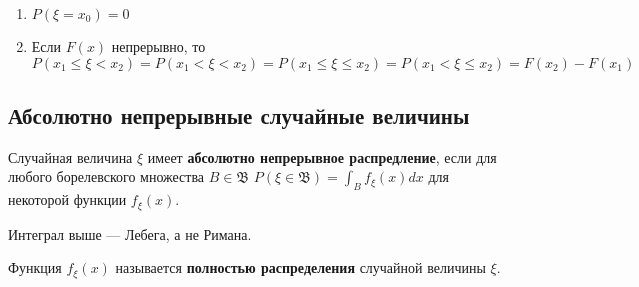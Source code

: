 \begin{prop}
\begin{enumerate}
\begin{proof}
                  \begin{align*}
                      P(C_n) + P(\xi \geq x_0)                       & = P(\xi = x_0)                           \\
                      P\left(x_0 \leq \xi < x_0 + \frac{1}{n}\right) & \xrightarrow{n \to +\infty} P(\xi = x_0) \\
                      F\left(x_0 + \frac{1}{n}\right) - F(x_0)       & \xrightarrow{n \to +\infty} P(\xi = x_0) \\
                      F(x_0 + 0) - F(x_0) = P(\xi = x_0)
                  \end{align*}
              \end{proof}

        \item \(P(\xi = x_0) = 0\)
        \item Если \(F(x)\) непрерывно, то \(P(x_1 \leq \xi < x_2) = P(x_1 < \xi < x_2) = P(x_1 \leq \xi \leq x_2) = P(x_1 < \xi \leq x_2) = F(x_2) - F(x_1)\)
    \end{enumerate}
\end{prop}

\subsection{Абсолютно непрерывные случайные величины}

\begin{definition}
    Случайная величина \(\xi\) имеет \textbf{абсолютно непрерывное распредление}, если для любого борелевского множества \(B \in \mathfrak{B}\) \(P(\xi \in \mathfrak{B}) = \int_B f_\xi(x) dx\) для некоторой функции \(f_\xi(x)\).
\end{definition}

\begin{remark}
    Интеграл выше --- Лебега, а не Римана.
\end{remark}

\begin{definition}
    Функция \(f_\xi(x)\) называется \textbf{полностью распределения} случайной величины \(\xi\).
\end{definition}

